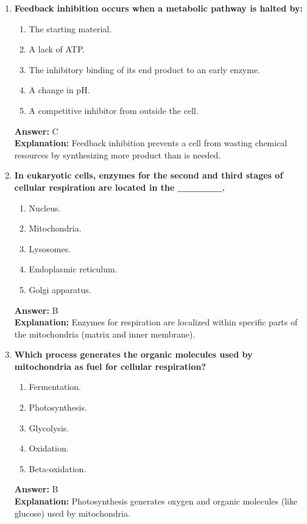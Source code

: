 \documentclass[11pt, a4paper]{article}
\begin{document}
\begin{enumerate}[leftmargin=*, label=\arabic*.]
\item \textbf{Feedback inhibition occurs when a metabolic pathway is halted by:}
\begin{enumerate}[label=\Alph*.]
    \item The starting material.
    \item A lack of ATP.
    \item The inhibitory binding of its end product to an early enzyme.
    \item A change in pH.
    \item A competitive inhibitor from outside the cell.
\end{enumerate}
\textbf{Answer:} C \\
\textbf{Explanation:} Feedback inhibition prevents a cell from wasting chemical resources by synthesizing more product than is needed.

\item \textbf{In eukaryotic cells, enzymes for the second and third stages of cellular respiration are located in the \_\_\_\_\_\_.}
\begin{enumerate}[label=\Alph*.]
    \item Nucleus.
    \item Mitochondria.
    \item Lysosomes.
    \item Endoplasmic reticulum.
    \item Golgi apparatus.
\end{enumerate}
\textbf{Answer:} B \\
\textbf{Explanation:} Enzymes for respiration are localized within specific parts of the mitochondria (matrix and inner membrane).


\item \textbf{Which process generates the organic molecules used by mitochondria as fuel for cellular respiration?}
\begin{enumerate}[label=\Alph*.]
    \item Fermentation.
    \item Photosynthesis.
    \item Glycolysis.
    \item Oxidation.
    \item Beta-oxidation.
\end{enumerate}
\textbf{Answer:} B \\
\textbf{Explanation:} Photosynthesis generates oxygen and organic molecules (like glucose) used by mitochondria.


\end{enumerate}
\end{document}
